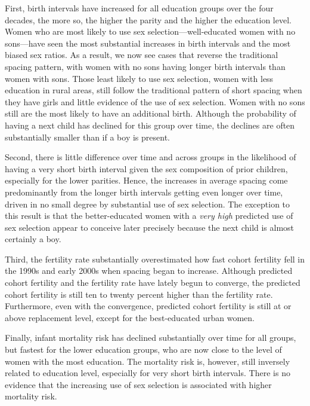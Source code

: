 \documentclass[12pt,letterpaper]{article}
\begin{document}
First, birth intervals have increased for all education groups over the four decades, 
the more so, the higher the parity and the higher the education level.
Women who are most likely to use sex selection---well-educated women with no
sons---have seen the most substantial increases in birth intervals and the most 
biased sex ratios.
As a result, we now see cases that reverse the traditional spacing
pattern, with women with no sons having longer birth intervals than
women with sons.
Those least likely to use sex selection, women with less education in rural areas, 
still follow the traditional pattern of short spacing when they have girls and 
little evidence of the use of sex selection.
Women with no sons still are the most likely to have an additional birth.
Although the probability of having a next child has declined for this group over time, the 
declines are often substantially smaller than if a boy is present.

Second, there is little difference over time and across groups in the likelihood of 
having a very short birth interval given the sex composition of prior children, 
especially for the lower parities.
Hence, the increases in average spacing come predominantly from the longer birth intervals
getting even longer over time, driven in no small degree by substantial use of sex 
selection.
The exception to this result is that the better-educated women with a \emph{very high} 
predicted use of sex selection appear to conceive later precisely because the next child 
is almost certainly a boy.

Third, the fertility rate substantially overestimated how fast cohort fertility fell 
in the 1990s and early 2000s when spacing began to increase.
Although predicted cohort fertility and the fertility rate have lately begun to converge,
the predicted cohort fertility is still ten to twenty percent higher than the
fertility rate.
Furthermore, even with the convergence, predicted cohort fertility is still at or above 
replacement level, except for the best-educated urban women.

Finally, infant mortality risk has declined substantially over time for all groups,
but fastest for the lower education groups, who are now close to the level of women with 
the most education.
The mortality risk is, however, still inversely related to education level, especially for 
very short birth intervals.
There is no evidence that the increasing use of sex selection is associated with higher 
mortality risk.


\end{document}
